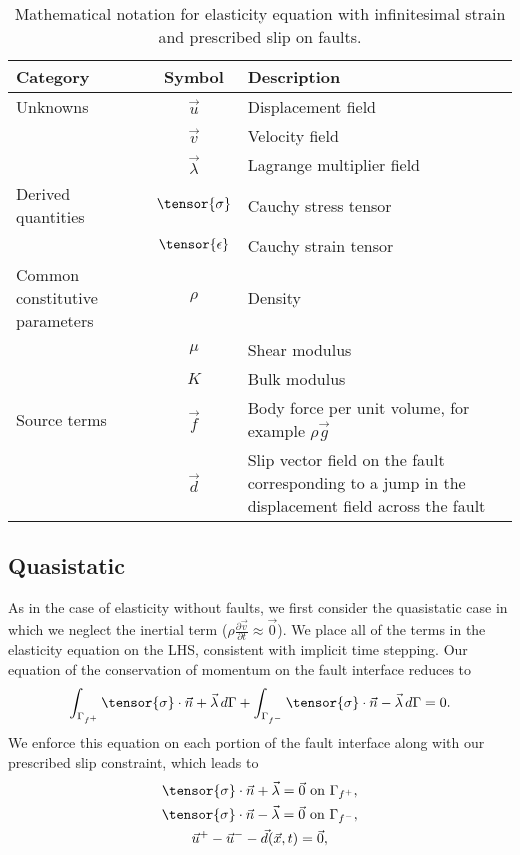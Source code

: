 \begin{table}[htbp]
  \caption{Mathematical notation for elasticity equation with
    infinitesimal strain and prescribed slip on faults.}
  \label{tab:notation:elasticity:prescribed:slip}
  \begin{tabular}{lcp{3in}}
    \toprule
    {\bf Category} & {\bf Symbol} & {\bf Description} \\
    \midrule
    Unknowns & $\vec{u}$ & Displacement field \\
    & $\vec{v}$ & Velocity field \\
    & $\vec{\lambda}$ & Lagrange multiplier field \\
    Derived quantities & $\tensor{\sigma}$ & Cauchy stress tensor \\
                   & $\tensor{\epsilon}$ & Cauchy strain tensor \\
    Common constitutive parameters & $\rho$ & Density \\
  & $\mu$ & Shear modulus \\
  & $K$ & Bulk modulus \\
Source terms & $\vec{f}$ & Body force per unit volume, for example $\rho \vec{g}$ \\
    & $\vec{d}$ & Slip vector field on the fault corresponding to a
      jump in the displacement field across the fault \\
    \bottomrule
  \end{tabular}
\end{table}

\subsection{Quasistatic}

As in the case of elasticity without faults, we first consider the quasistatic case in which we neglect the inertial term ($\rho \frac{\partial \vec{v}}{\partial t} \approx \vec{0}$).
We place all of the terms in the elasticity equation on the LHS, consistent with implicit time stepping.
Our equation of the conservation of momentum on the fault interface reduces to
\begin{equation}
  \int_{\Gamma_{f^+}} \tensor{\sigma} \cdot \vec{n} + \vec{\lambda} \, d\Gamma + \int_{\Gamma_{f^-}} \tensor{\sigma} \cdot \vec{n} - \vec{\lambda} \, d\Gamma = 0.
\end{equation}
We enforce this equation on each portion of the fault interface along with our prescribed slip constraint, which leads to
\begin{gather}
  \tensor{\sigma} \cdot \vec{n} + \vec{\lambda} = \vec{0} \text{ on } \Gamma_{f^+}, \\
  \tensor{\sigma} \cdot \vec{n} - \vec{\lambda} = \vec{0}\text{ on } \Gamma_{f^-}, \\
  \vec{u}^+ - \vec{u}^- - \vec{d}(\vec{x},t) = \vec{0},  
\end{gather}


